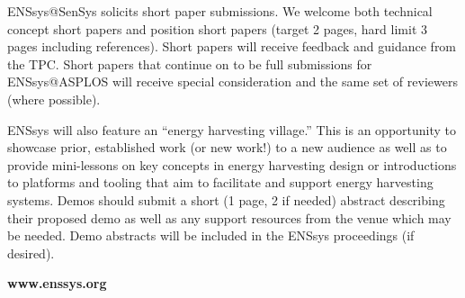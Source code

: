 \documentclass[a4paper,10pt]{scrartcl}
\begin{document}
\vskip4mm
ENSsys@SenSys solicits short paper submissions.
We welcome both technical concept short papers and position short papers (target 2 pages, hard limit 3 pages including references).
%
Short papers will receive feedback and guidance from the TPC.
%
Short papers that continue on to be full submissions for ENSsys@ASPLOS will receive
special consideration and the same set of reviewers (where possible).
%

\smallskip

ENSsys will also feature an ``energy harvesting village.''
%
This is an opportunity to showcase prior, established work (or new work!) to a new audience
as well as to provide mini-lessons on key concepts in energy harvesting design
or introductions to platforms and tooling that aim to facilitate and support
energy harvesting systems.
%
Demos should submit a short (1 page, 2 if needed) abstract describing their proposed demo as well as any support resources from the venue which may be needed.
%
Demo abstracts will be included in the ENSsys proceedings (if desired).

\begin{center}
  \Huge\bfseries\textcolor{cfp_darkcolor}{www.enssys.org}
\end{center}

\end{document}
